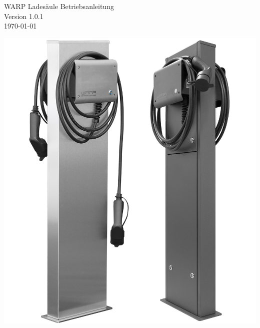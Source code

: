 \documentclass[a4paper,10pt]{article}
\title{}
\author{}
\begin{document}
\pagestyle{empty}
\begin{titlepage}
	\vspace*{-3.08cm}
	\colorbox{boxgray}{}
	\vfill
	\begin{center}
		\Huge
		WARP Ladesäule Betriebsanleitung\\\vspace{1cm}
		\large
		Version 1.0.1\\\vspace{0.25cm}
		\today
	\end{center}
	\vfill
	\begin{center}
		\includegraphics[width=0.6\linewidth]{./img/warp-charger-stands}
	\end{center}
\end{titlepage}
\newpage
\null
\newpage
\pagestyle{fancy}
\end{document}
